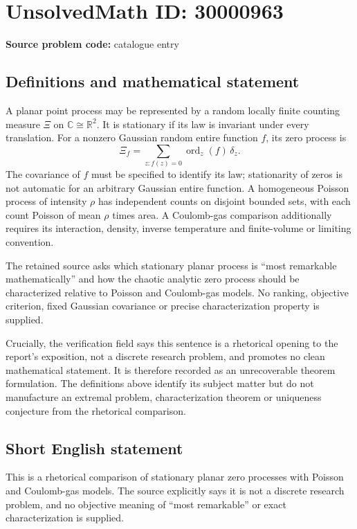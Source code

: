 \documentclass[11pt]{article}
\newcommand{\R}{\mathbb{R}}
\newcommand{\C}{\mathbb{C}}
\begin{document}
\section*{UnsolvedMath ID: 30000963}
\textbf{Source problem code:} catalogue entry
\subsection{Definitions and mathematical statement}
A planar point process may be represented by a random locally finite counting measure $\Xi$ on $\C\cong\R^2$. It is stationary if its law is invariant under every translation. For a nonzero Gaussian random entire function $f$, its zero process is
\[
\Xi_f=\sum_{z:f(z)=0}\operatorname{ord}_z(f)\,\delta_z.
\]
The covariance of $f$ must be specified to identify its law; stationarity of zeros is not automatic for an arbitrary Gaussian entire function. A homogeneous Poisson process of intensity $\rho$ has independent counts on disjoint bounded sets, with each count Poisson of mean $\rho$ times area. A Coulomb-gas comparison additionally requires its interaction, density, inverse temperature and finite-volume or limiting convention.

The retained source asks which stationary planar process is ``most remarkable mathematically'' and how the chaotic analytic zero process should be characterized relative to Poisson and Coulomb-gas models. No ranking, objective criterion, fixed Gaussian covariance or precise characterization property is supplied.

Crucially, the verification field says this sentence is a rhetorical opening to the report's exposition, not a discrete research problem, and promotes no clean mathematical statement. It is therefore recorded as an unrecoverable theorem formulation. The definitions above identify its subject matter but do not manufacture an extremal problem, characterization theorem or uniqueness conjecture from the rhetorical comparison.
\subsection{Short English statement}
This is a rhetorical comparison of stationary planar zero processes with Poisson and Coulomb-gas models. The source explicitly says it is not a discrete research problem, and no objective meaning of ``most remarkable'' or exact characterization is supplied.
\end{document}
